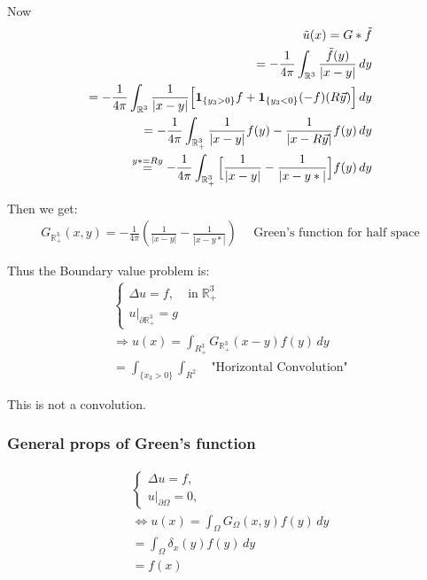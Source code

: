 \documentclass[11pt]{article}
\begin{document}
Now 
\begin{align*}
    \tilde{u}(x) = G*\tilde{f}\\
    = - \frac{1}{4\pi} \int_{\mathbb{R}^{3}} \frac{\tilde{f}(y)}{|x-y|}\,dy\\
    = -\frac{1}{4\pi}\int_{\mathbb{R}^{3}} \frac{1}{|x-y|}
     \Big[\bm{1} _{\{ y_3 > 0 \}}f + \bm{1}_{\{ y_3 < 0 \}}(-f)(R\vec{y})\Big]\,dy\\
    = -\frac{1}{4\pi} \int_{\mathbb{R}_{+}^{3}} \frac{1}{|x-y|}f(y) - \frac{1}{|x-R\vec{y}|}f(y)\,dy\\
    \overset{y*=Ry}{=} - \frac{1}{4\pi} \int_{\mathbb{R}_{+}^{3}} \Big[\frac{1}{|x-y|}-\frac{1}{|x-y*|} \Big]f(y)\,dy \\
\end{align*}

Then we get:
\begin{align*}
    G_{\mathbb{R}_{+}^{3}}(x,y) = -\frac{1}{4\pi} (\frac{1}{|x-y|} - \frac{1}{|x-y*|}) \quad
        \text{ Green's function for half space}
\end{align*}

Thus the Boundary value problem is:
\begin{equation}
    \begin{aligned}
    \begin{cases} 
        \Delta u = f, & \text{in} \;\mathbb{R}_{+}^{3} \\ 
        u|_{\partial \mathbb{R}_{+}^{3}} = g   
        \end{cases} \\
    \Longrightarrow u(x) = \int_{R_{+}^{3}} G_{\mathbb{R}_{+}^{3}}(x-y)f(y)\,dy\\
    = \int_{\{ x_3>0 \}} \int_{R^{2}} \quad \text{"Horizontal Convolution"}
    \end{aligned}
\end{equation}
\begin{remark}
    This is not a convolution.
\end{remark}

\subsubsection{General props of Green's function}
\begin{equation}
    \begin{aligned}
        \begin{cases} 
            \Delta u = f, &  \\ 
            u|_{\partial \Omega} = 0, &   
            \end{cases} \\
    \iff u(x)= \int_{\Omega} G_{\Omega} (x,y) f(y)\,dy\\
    = \int_{\Omega} \delta_{x}(y)f(y)\,dy \\
    = f(x)
    \end{aligned}
\end{equation}
\end{document}
